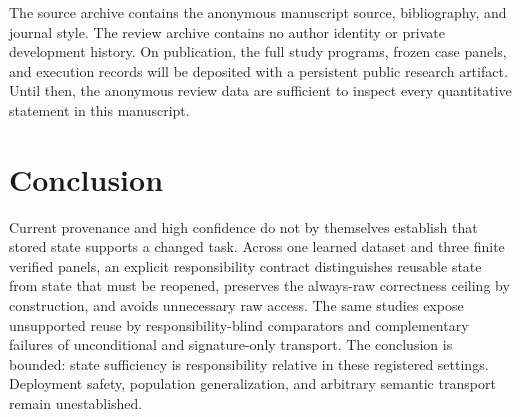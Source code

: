 \documentclass[10pt]{article}
\begin{document}
The source archive contains the anonymous manuscript source, bibliography, and journal style. The review archive contains no author identity or private development history. On publication, the full study programs, frozen case panels, and execution records will be deposited with a persistent public research artifact. Until then, the anonymous review data are sufficient to inspect every quantitative statement in this manuscript.

\section{Conclusion}

Current provenance and high confidence do not by themselves establish that stored state supports a changed task. Across one learned dataset and three finite verified panels, an explicit responsibility contract distinguishes reusable state from state that must be reopened, preserves the always-raw correctness ceiling by construction, and avoids unnecessary raw access. The same studies expose unsupported reuse by responsibility-blind comparators and complementary failures of unconditional and signature-only transport. The conclusion is bounded: state sufficiency is responsibility relative in these registered settings. Deployment safety, population generalization, and arbitrary semantic transport remain unestablished.



\end{document}
